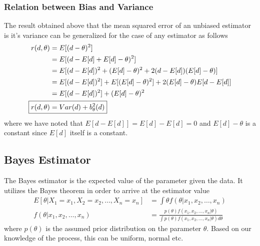 \documentclass[../probability-notes.tex]{subfiles}
\begin{document}
    \subsubsection{Relation between Bias and Variance}
    The result obtained above that the mean squared error of an unbiased estimator is it's variance can be generalized for the case of any estimator as follows
    \begin{align*}
        r(d, \theta) &= E[(d - \theta)^{2}]\\
        &= E[(d - E[d] + E[d] -\theta)^{2}]\\
        &= E[(d - E[d])^{2} + (E[d] - \theta)^{2} + 2(d - E[d])(E[d] - \theta)]\\
        &= E[(d - E[d])^{2}] + E[(E[d] - \theta)^{2}] + 2(E[d] - \theta)E[d - E[d]]\\
        &= E[(d - E[d])^{2}] + (E[d] - \theta)^{2}\\
        \Aboxed{r(d, \theta) &= Var(d) + b_{\theta}^{2}(d)}\\
    \end{align*}
    where we have noted that $E[d - E[d]] = E[d] - E[d] = 0$ and $E[d] - \theta$ is a constant since $E[d]$ itself is a constant.


    \subsection{Bayes Estimator}
    The Bayes estimator is the expected value of the parameter given the data. It utilizes the Bayes theorem in order to arrive at the estimator value
    \begin{align*}
        E[\theta|X_{1} = x_{1}, X_{2} = x_{2}, \ldots, X_{n} = x_{n}] &= \int \theta f(\theta|x_{1}, x_{2}, \ldots, x_{n})\\
        f(\theta|x_{1}, x_{2}, \ldots, x_{n}) &= \frac{p(\theta) f(x_{1}, x_{2}, \ldots, x_{n} | \theta)}{\int p(\theta) f(x_{1}, x_{2}, \ldots, x_{n} | \theta) d\theta}
    \end{align*}
    where $p(\theta)$ is the assumed prior distribution on the parameter $\theta$. Based on our knowledge of the process, this can be uniform, normal etc.
\end{document}
